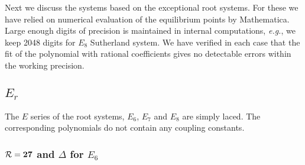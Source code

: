 \documentclass[a4paper,12pt]{article}
\begin{document}
\bigskip
Next we discuss the systems based on the exceptional root systems. For these
we have relied on numerical evaluation of the equilibrium points by 
Mathematica.
Large enough digits of precision is maintained in internal computations,
{\it e.g.}, we keep 2048 digits for $E_8$ Sutherland system.
We have verified in each case that the fit of the polynomial with rational
coefficients gives no detectable errors within the working precision.

\subsection{$E_r$}

The $E$ series of the root systems, $E_6$, $E_7$ and $E_8$ are simply laced.
The corresponding polynomials do not contain any coupling constants.

\subsubsection{${\cal R}={\bf 27}$ and $\Delta$ for $E_6$}
\end{document}
